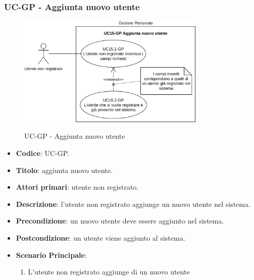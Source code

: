 \subsubsection{UC\theuccount-GP - Aggiunta nuovo utente}
		\begin{figure}[H]
			\centering
				\includegraphics[width=0.8\textwidth]{img/casi_d'uso/UC15.png}\\
			\caption{UC\theuccount-GP - Aggiunta nuovo utente}
		\end{figure}
	\begin{itemize}
		\item \textbf{Codice}: UC\theuccount-GP.
		\item \textbf{Titolo}: aggiunta nuovo utente.
		\item \textbf{Attori primari}: utente non registrato.
		\item \textbf{Descrizione}: l'utente non registrato aggiunge un nuovo utente nel sistema.
		\item \textbf{Precondizione}: un nuovo utente deve essere aggiunto nel sistema.
		\item \textbf{Postcondizione}: un utente viene aggiunto al sistema.
		\item \textbf{Scenario Principale}:
		\begin{enumerate}
			\item L'utente non registrato aggiunge di un nuovo utente
		\end{enumerate}
	\end{itemize}
	
